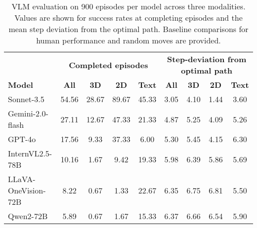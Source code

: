 \begin{table*}[h]
    \caption{VLM evaluation on 900 episodes per model across three modalities. Values are shown for success rates at completing episodes and the mean step deviation from the optimal path. Baseline comparisons for human performance and random moves are provided.}
    

\label{tab:VLM_main_statistics}
    \centering
    \begin{tabular}{l|cccc|cccc}
        \toprule
        & \multicolumn{4}{c|}{\textbf{Completed episodes}} & \multicolumn{4}{c}{\textbf{Step-deviation from optimal path}} \\
        \cmidrule(lr){2-5} \cmidrule(lr){6-9}
        \textbf{Model} & \textbf{All} & \textbf{3D} & \textbf{2D} & \textbf{Text} & \textbf{All} & \textbf{3D} & \textbf{2D} & \textbf{Text} \\
        \midrule
        Sonnet-3.5 \cite{claudesonnet35} & 54.56 & 28.67 & 89.67 & 45.33 & 3.05 & 4.10 & 1.44 & 3.60 \\
        Gemini-2.0-flash \cite{gemini20flash} & 27.11 & 12.67 & 47.33 & 21.33 & 4.87 & 5.25 & 4.09 & 5.26 \\
        GPT-4o \cite{gpt4o}  & 17.56 & 9.33 & 37.33 & 6.00 & 5.30 & 5.45 & 4.15 & 6.30 \\
        InternVL2.5-78B \cite{chen2024expanding} & 10.16 & 1.67 & 9.42 & 19.33 & 5.98 & 6.39 & 5.86 & 5.69 \\
        LLaVA-OneVision-72B \cite{li2024llava}   & 8.22 & 0.67 & 1.33 & 22.67 & 6.35 & 6.75 & 6.81 & 5.50 \\
        Qwen2-72B \cite{Qwen2VL} & 5.89 & 0.67 & 1.67 & 15.33 & 6.37 & 6.66 & 6.54 & 5.90 \\
        \bottomrule
    \end{tabular}
\end{table*}